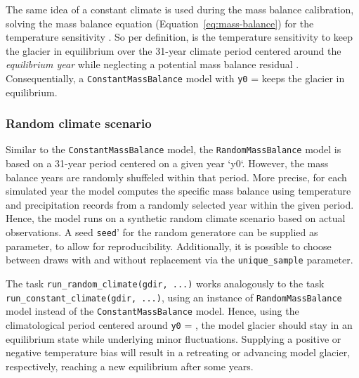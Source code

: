             The same idea of a constant climate is used during the mass balance calibration, solving the mass balance equation (Equation~\ref{eq:mass-balance}) for the temperature sensitivity \mustar. So per definition, \mustar{} is the temperature sensitivity to keep the glacier in equilibrium over the 31-year climate period centered around the \textit{equilibrium year} \tstar{} while neglecting a potential mass balance residual \bias. Consequentially, a \lstinline`ConstantMassBalance` model with \lstinline`y0` = \tstar{} keeps the glacier in equilibrium.
        

        \subsubsection{Random climate scenario} %
        \label{ssub:random_climate_scenario_implementation}

            Similar to the \lstinline`ConstantMassBalance` model, the \lstinline`RandomMassBalance` model is based on a 31-year period centered on a given year `y0`. However, the mass balance years are randomly shuffeled within that period. More precise, for each simulated year the model computes the specific mass balance using temperature and precipitation records from a randomly selected year within the given period. Hence, the model runs on a synthetic random climate scenario based on actual observations. A seed \lstinline`seed`' for the random generatore can be supplied as parameter, to allow for reproducibility. Additionally, it is possible to choose between draws with and without replacement via the \lstinline`unique_sample` parameter.

            The task \lstinline`run_random_climate(gdir, ...)` works analogously to the task \lstinline`run_constant_climate(gdir, ...)`, using an instance of \lstinline`RandomMassBalance` model instead of the \lstinline`ConstantMassBalance` model. Hence, using the climatological period centered around \lstinline`y0` = \tstar, the model glacier should stay in an equilibrium state while underlying minor fluctuations. Supplying a positive or negative temperature bias will result in a retreating or advancing model glacier, respectively, reaching a new equilibrium after some years.
        
    

